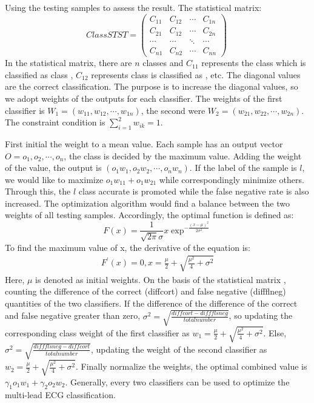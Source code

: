 \documentclass[graybox]{svmult}
\begin{document}
Using the testing samples to assess the result. The statistical matrix:
\begin{equation}
ClassSTST = \left(
\begin{array}{cccc}
 C_{11} & C_{12} & \cdots & C_{1n}\\
 C_{21} & C_{12} & \cdots & C_{2n}\\
 \cdots & \cdots & \ddots & \cdots\\
 C_{n1} & C_{n2} & \cdots & C_{nn}
\end{array}
\right)~
\end{equation}
In the statistical matrix, there are $n$ classes and $C_{11}$ represents the class \uppercase\expandafter{} which is classified as class \uppercase\expandafter{}, $C_{12}$ represents class \uppercase\expandafter{} is classified as \uppercase\expandafter{}, etc. 
The diagonal values are the correct classification. The purpose is to increase the diagonal values, so we adopt weights of the outputs for each classifier. 
The weights of the first classifier is $W_1 = (w_{11}, w_{12}, \cdots, w_{1n})$, the second were $W_2 = (w_{21}, w_{22}, \cdots, w_{2n})$. The constraint condition is $\sum\nolimits_{i=1}^2{w_{ik}} = 1$. 

First initial the weight to a mean value. Each sample has an output vector $O = {o_1, o_2, \cdots, o_n}$, the class is decided by the maximum value. Adding the weight of the value, the output is $(o_1w_1 ,o_2w_2, \cdots, o_nw_n)$. If the label of the sample is $l$, we would like to maximize $o_1w_{11} + o_1w_{21}$ while correspondingly minimize others. Through this, the $l$ class accurate is promoted while the false negative rate is also increased. The optimization algorithm would find a balance between the two weights of all testing samples. Accordingly, the optimal function is defined as:
\begin{equation}
F(x) = \frac{1}{\sqrt{2\pi}\sigma}x\exp^{-\frac{(x-\mu)^2}{2\sigma^2}}
\end{equation}
To find the maximum value of x, the derivative of the equation is:
\begin{equation}
\begin{split}
F^{'}(x) = 0, x = \frac{\mu}{2}+\sqrt{\frac{\mu^2}{4}+\sigma^2}
\end{split}
\end{equation}
Here, $\mu$ is denoted as initial weights. On the basis of the statistical matrix , counting the difference of the correct (diffcort) and false negative (diffflneg) quantities of the two classifiers. If the difference of the difference of the correct and false negative greater than zero, $\sigma^2 = \sqrt{\frac{diffcort - diffflsneg}{totalnumber}}$, so updating the corresponding class weight of the first classifier as $w_1 = \frac{\mu}{2}+\sqrt{\frac{\mu^2}{4}+\sigma^2}$. Else, $\sigma^2 = \sqrt{\frac{diffflsneg - diffcort}{totalnumber}}$, updating the weight of the second classifier as $w_2 = \frac{\mu}{2}+\sqrt{\frac{\mu^2}{4}+\sigma^2}$. Finally normalize the weights, the optimal combined value is $\gamma_1o_1w_1 + \gamma_2o_2w_2$. Generally, every two classifiers can be used to optimize the multi-lead ECG classification.
\end{document}

